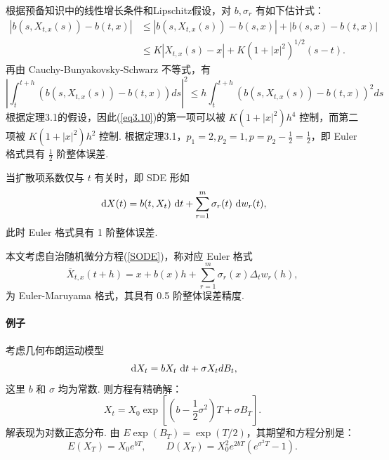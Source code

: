 根据预备知识中的线性增长条件和Lipschitz假设，对 $b,\sigma_r$ 有如下估计式：
\begin{equation}\label{eq3.11}
	\begin{aligned}
	\left|  b(s,X_{t,x}(s)) - b(t,x) \right| 
	& \le   |b(s,X_{t,x}(s)) - b(s,x)|+ |b(s,x) - b(t,x)| \\
	& \le   K| X_{t,x}(s) - x| + K \left(1+|x|^2\right)^{1/2} (s-t).
	\end{aligned}
\end{equation}
再由 Cauchy-Bunyakovsky-Schwarz 不等式，有
\[
\left|\int_{t}^{t+h}\left(b\left(s, X_{t, x}(s)\right)-b(t, x)\right) d s\right|^{2} \leq h \int_{t}^{t+h}\left(b\left(s, X_{t, x}(s)\right)-b(t, x)\right)^{2} d s
\]
根据定理3.1的假设，因此(\ref{eq3.10})的第一项可以被 $K(1+|x|^2)h^4$ 控制，而第二项被 $K(1+|x|^2)h^2$ 控制. 根据定理3.1，$p_1=2,p_2=1,p=p_2-\frac12=\frac12$，即 Euler 格式具有 $\frac12$ 阶整体误差. 

\begin{remark}
当扩散项系数仅与 $t$ 有关时，即 SDE 形如
\begin{equation}\label{eq3.12}
	\text{ d} X(t) = b(t,X_t) \text{ d} t + \sum_{r=1}^m \sigma_r(t) \text{ d} w_r(t),
\end{equation}
此时 Euler 格式具有 1 阶整体误差. 
\end{remark}


本文考虑自治随机微分方程(\ref{SODE})，称对应 Euler 格式
\begin{equation}\label{Euler_Maruyama}
	\overline{X}_{t,x}(t+h) = x+b(x)h+\sum_{r=1}^m \sigma_r(x) \Delta_t w_r(h),
\end{equation}
为 Euler-Maruyama 格式，其具有 0.5 阶整体误差精度.

\paragraph*{ 例子}
考虑几何布朗运动模型
\[
 \text{ d} X_t = b X_t \text{ d} t + \sigma X_t d B_t,
\]
这里 $b$ 和 $\sigma$ 均为常数. 则方程有精确解：
\[
	X_t = X_0 \exp \left[\left(b-\frac12\sigma^2\right)T + \sigma B_T\right]. 
\]
解表现为对数正态分布. 由 $E \exp (B_T) = \exp(T/2)$，其期望和方程分别是：
\[
	E(X_T) = X_0 e^{bT},\qquad D(X_T) = X_0^2 e^{2bT} \left( e^{\sigma^2T}-1 \right).
\]

